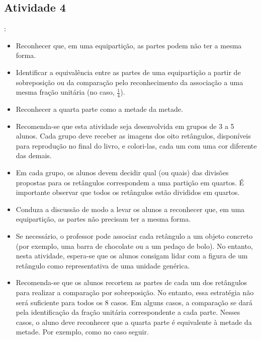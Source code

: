 \begin{multicols}{2}
\subsection{Atividade 4}
  \vspace{.1cm}:
\begin{itemize} %
    \item       Reconhecer que, em uma equipartição, as partes podem não ter a mesma forma.
    \item       Identificar a equivalência entre as partes de uma equipartição a partir de sobreposição ou da comparação pelo reconhecimento da associação a uma mesma fração unitária (no caso, $\frac{1}{4}$).
    \item       Reconhecer a quarta parte como a metade da metade.
\end{itemize} %
 \vspace{.1cm}

   \vspace{.1cm}

\begin{itemize} %
    \item       Recomenda-se que esta atividade seja desenvolvida em grupos de 3 a 5 alunos. Cada grupo deve receber as imagens dos oito retângulos, disponíveis para reprodução no final do livro, e colori-las, cada um com uma cor diferente das demais.
    \item       Em cada grupo, os alunos devem decidir qual (ou quais) das divisões propostas para os retângulos correspondem a uma partição em quartos. É importante observar que todos os retângulos estão divididos em quartos.
    \item       Conduza a discussão de modo a levar os alunos a reconhecer que, em uma equipartição, as partes não precisam ter a mesma forma.
    \item       Se necessário, o professor pode associar cada retângulo a um objeto concreto (por exemplo, uma barra de chocolate ou a um pedaço de bolo). No entanto, nesta atividade, espera-se que os alunos consigam lidar com a figura de um retângulo como representativa de uma unidade genérica.
    \item       Recomenda-se que os alunos recortem as partes de cada um dos retângulos para realizar a comparação por sobreposição. No entanto, essa estratégia não será suficiente para todos os 8 casos. Em alguns casos, a comparação se dará pela identificação da fração unitária correspondente a cada parte. Nesses casos, o aluno deve reconhecer que a quarta parte é equivalente à metade da metade. Por exemplo, como no caso seguir.
\end{itemize} %


\end{multicols}

